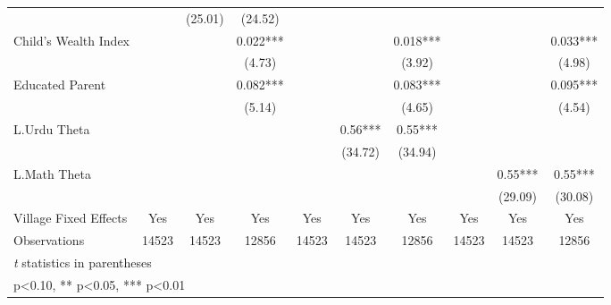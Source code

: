 \begin{sidewaystable}[htbp]
\begin{tabular}{l*{9}{c}}
                &            &  (25.01)   &  (24.52)   &            &            &            &            &            &            \\
Child's Wealth Index&            &            &    0.022***&            &            &    0.018***&            &            &    0.033***\\
                &            &            &   (4.73)   &            &            &   (3.92)   &            &            &   (4.98)   \\
Educated Parent &            &            &    0.082***&            &            &    0.083***&            &            &    0.095***\\
                &            &            &   (5.14)   &            &            &   (4.65)   &            &            &   (4.54)   \\
L.Urdu Theta    &            &            &            &            &     0.56***&     0.55***&            &            &            \\
                &            &            &            &            &  (34.72)   &  (34.94)   &            &            &            \\
L.Math Theta    &            &            &            &            &            &            &            &     0.55***&     0.55***\\
                &            &            &            &            &            &            &            &  (29.09)   &  (30.08)   \\
Village Fixed Effects&      Yes   &      Yes   &      Yes   &      Yes   &      Yes   &      Yes   &      Yes   &      Yes   &      Yes   \\
\midrule
Observations    &    14523   &    14523   &    12856   &    14523   &    14523   &    12856   &    14523   &    14523   &    12856   \\
\bottomrule
\multicolumn{10}{l}{\footnotesize \textit{t} statistics in parentheses}\\
\multicolumn{10}{l}{\footnotesize * p<0.10, ** p<0.05, *** p<0.01}\\
\end{tabular}
\end{sidewaystable}
